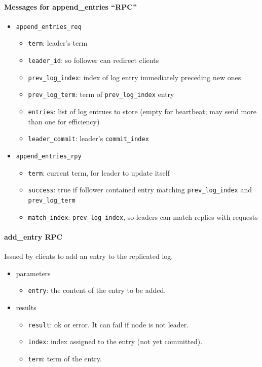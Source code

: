 \documentclass[a4paper]{article}
\begin{document}
\paragraph{Messages for append\_entries ``RPC''}
\begin{itemize}
    \item \texttt{append\_entries\_req}
    \begin{itemize}
        \item \texttt{term}: leader's term
        \item \texttt{leader\_id}: so follower can redirect clients
        \item \texttt{prev\_log\_index}: index of log entry immediately preceding new ones
        \item \texttt{prev\_log\_term}: term of \texttt{prev\_log\_index} entry
        \item \texttt{entries}: list of log entrues to store (empty for heartbeat; may send more than one for efficiency)
        \item \texttt{leader\_commit}: leader's \texttt{commit\_index}
    \end{itemize}
    \item \texttt{append\_entries\_rpy}
    \begin{itemize}
        \item \texttt{term}: current term, for leader to update itself
        \item \texttt{success}: true if follower contained entry matching \texttt{prev\_log\_index} and \texttt{prev\_log\_term}
        \item \texttt{match\_index}: \texttt{prev\_log\_index}, so leaders can match replies with requests
    \end{itemize}
\end{itemize}

\paragraph{add\_entry RPC}
Issued by clients to add an entry to the replicated log.
\begin{itemize}
    \item parameters
    \begin{itemize}
        \item \texttt{entry}: the content of the entry to be added.
    \end{itemize}
    \item results
    \begin{itemize}
        \item \texttt{result}: ok or error. It can fail if node is not leader.
        \item \texttt{index}: index assigned to the entry (not yet committed).
        \item \texttt{term}: term of the entry.
    \end{itemize}
\end{itemize}
\end{document}

